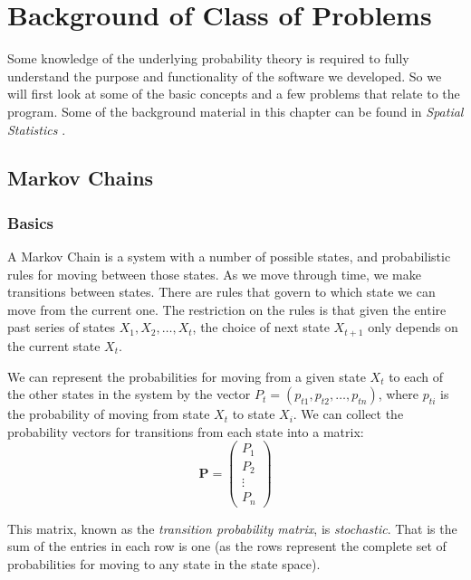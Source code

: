 \chapter{Background of Class of Problems}

\newtheorem{algorithm}{Algorithm}

Some knowledge of the underlying probability theory is required to
fully understand the purpose and functionality of the software we
developed.  So we will first look at some of the basic concepts and a
few problems that relate to the program.  Some of the background
material in this chapter can be found in \emph{Spatial Statistics}
\cite{spatial-stats}.

\section{Markov Chains}

\subsection{Basics}

A Markov Chain is a system with a number of possible states, and
probabilistic rules for moving between those states.  As we move
through time, we make transitions between states.  There are rules
that govern to which state we can move from the current one.  The
restriction on the rules is that given the entire past series of
states $X_1, X_2, \ldots, X_t$, the choice of next state $X_{t+1}$
only depends on the current state $X_t$.

We can represent the probabilities for moving from a given state $X_t$
to each of the other states in the system by the vector $P_t =
(p_{t1}, p_{t2}, \ldots, p_{tn})$, where $p_{ti}$ is the probability
of moving from state $X_t$ to state $X_i$.  We can collect the
probability vectors for transitions from each state into a matrix:
\begin{equation}
\mathbf{P} = \left(\begin{array}{c}
P_1 \\
P_2 \\
\vdots \\
P_n
\end{array}\right)
\end{equation}


\noindent This matrix, known as the \emph{transition probability
matrix}, is \emph{stochastic}.  That is the sum of the entries in each
row is one (as the rows represent the complete set of probabilities
for moving to any state in the state space).

